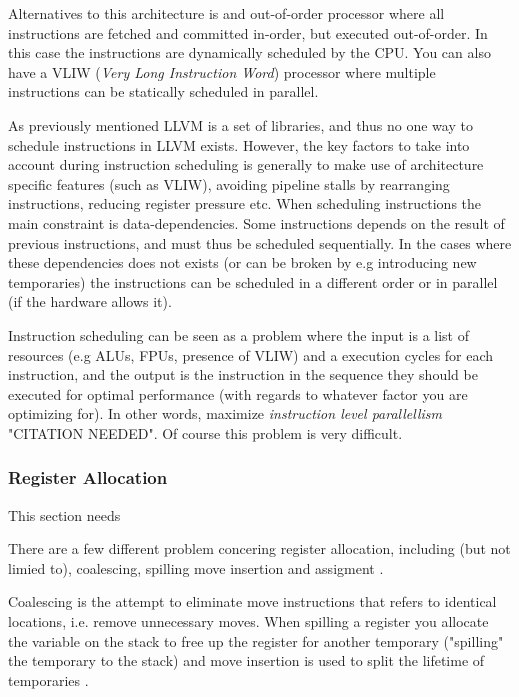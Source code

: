 Alternatives to this architecture is and out-of-order processor where all instructions are
fetched and committed in-order, but executed out-of-order. In this case the instructions
are dynamically scheduled by the CPU. You can also have a VLIW (\textit{Very Long Instruction
Word}) processor where multiple instructions can be statically scheduled in parallel.


As previously mentioned LLVM is a set of libraries, and thus no one way to schedule instructions
in LLVM exists. However, the key factors to take into account during instruction scheduling
is generally to make use of architecture specific features (such as VLIW), avoiding pipeline
stalls by rearranging instructions, reducing register pressure etc. When scheduling instructions
the main constraint is data-dependencies. Some instructions depends on the result of previous
instructions, and must thus be scheduled sequentially. In the cases where these dependencies
does not exists (or can be broken by e.g introducing new temporaries) the instructions
can be scheduled in a different order or in parallel (if the hardware allows it).

Instruction scheduling can be seen as a problem where the input is a list of resources
(e.g ALUs, FPUs, presence of VLIW) and a execution cycles for each instruction, and the
output is the instruction in the sequence they should be executed for optimal performance
(with regards to whatever factor you are optimizing for). In other words, maximize \textit{
	instruction level parallellism} "CITATION NEEDED". Of course this problem is very difficult.

\subsubsection{Register Allocation}

This section needs

There are a few different problem concering register allocation, including (but not limied
to), coalescing, spilling move insertion and assigment \cite{alloc-deconstructed,
llvm-codegenerator-allocation}.

Coalescing is the attempt to eliminate move instructions that refers to identical locations,
i.e. remove unnecessary moves. When spilling a register you allocate the variable on the
stack to free up the register for another temporary ("spilling" the temporary to the stack)
and move insertion is used to split the lifetime of temporaries \cite{alloc-deconstructed}.

